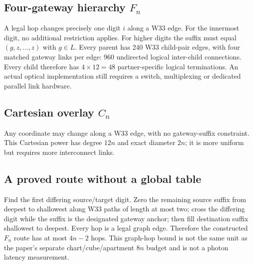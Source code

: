 \documentclass[10pt]{article}
\begin{document}
\subsection{Four-gateway hierarchy $F_n$}
A legal hop changes precisely one digit $i$ along a W33 edge. For the innermost digit, no additional restriction applies. For higher digits the suffix must equal $(g,z,\dots,z)$ with $g\in L$. Every parent has 240 W33 child-pair edges, with four matched gateway links per edge: 960 undirected logical inter-child connections. Every child therefore has $4\times12=48$ partner-specific logical terminations. An actual optical implementation still requires a switch, multiplexing or dedicated parallel link hardware.
\subsection{Cartesian overlay $C_n$}
Any coordinate may change along a W33 edge, with no gateway-suffix constraint. This Cartesian power has degree $12n$ and exact diameter $2n$; it is more uniform but requires more interconnect links.
\subsection{A proved route without a global table}
Find the first differing source/target digit. Zero the remaining source suffix from deepest to shallowest along W33 paths of length at most two; cross the differing digit while the suffix is the designated gateway anchor; then fill destination suffix shallowest to deepest. Every hop is a legal graph edge. Therefore the constructed $F_n$ route has at most $4n-2$ hops. This graph-hop bound is not the same unit as the paper's separate chart/cube/apartment $8n$ budget and is not a photon latency measurement.
\begin{center}
\end{center}
\end{document}
